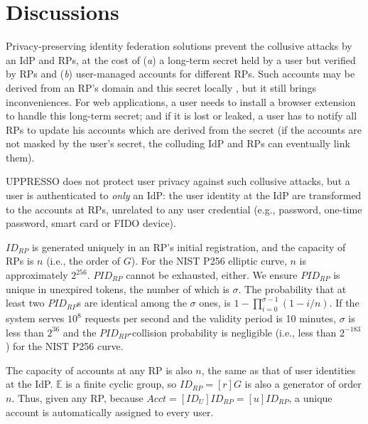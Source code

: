 \section{Discussions}
\label{sec:discussion}

Privacy-preserving identity federation solutions \cite{ELPASSO,UnlimitID,idemix,PseudoID,Opaak,uprov}
 prevent the collusive attacks by an IdP and RPs,
    at the cost of (\emph{a}) a long-term secret held by a user but verified by RPs
        and (\emph{b}) user-managed accounts \cite{PseudoID} for different RPs.
Such accounts may be derived from an RP's domain and this secret locally \cite{ELPASSO,UnlimitID,Opaak,uprov,idemix},
  but it still brings inconveniences.
For web applications, a user needs to install a browser extension to handle this long-term secret;
  and if it is lost or leaked,
       a user has to notify all RPs to update his accounts which are derived from the secret
        (if the accounts are not masked by the user's secret, the colluding IdP and RPs can eventually link them).

UPPRESSO does not protect user privacy against such collusive attacks,
    but a user is authenticated to \emph{only} an IdP:
         the user identity at the IdP
                are transformed to the accounts at RPs, unrelated to any user credential
                 (e.g., password, one-time password, smart card or FIDO device).


\vspace{0.75mm}
$ID_{RP}$ is generated uniquely in an RP's initial registration,
    and the capacity of RPs is $n$ (i.e., the order of $G$). For the NIST P256 elliptic curve, $n$ is approximately $2^{256}$.
$PID_{RP}$ cannot be exhausted, either.
We ensure $PID_{RP}$ is unique in unexpired tokens,
    the number of which is $\sigma$.
The probability that at least two $PID_{RP}$s are identical among the $\sigma$ ones,
    is $1-\prod_{i=0}^{\sigma-1}(1-i/n)$.
If the system serves $10^{8}$ requests per second and the validity period is 10 minutes,
     $\sigma$ is less than $2^{36}$ and the $PID_{RP}$-collision probability is negligible (i.e., less than $2^{-183}$)
      for the NIST P256 curve.

The capacity of accounts at any RP is also $n$,
    the same as that of user identities at the IdP.
$\mathbb{E}$ is a finite cyclic group,
    so $ID_{RP} = [r]G$ is also a generator of order $n$.
Thus, given any RP,
because $Acct =  [ID_U]ID_{RP} = [u]ID_{RP}$,
    a unique account is automatically assigned to every user.

